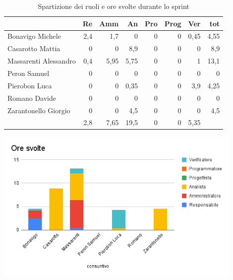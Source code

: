 \begin{table}[ht]
    \begin{tabularx}{\linewidth}{X|rrrrrrr}
    \rowcolor{gray!30}& Re & Amm & An & Pro & Prog & Ver & tot \\
    \hline
    Bonavigo Michele                        & 2,4 & 1,7 & 0 & 0 & 0 & 0,45  & 4,55 \\
    \rowcolor{gray!10}Casarotto Mattia      & 0 & 0 & 8,9 & 0 & 0 & 0 & 8,9 \\
    Massarenti Alessandro                   & 0,4 & 5,95 & 5,75 & 0 & 0 & 1  & 13,1 \\
    \rowcolor{gray!10}Peron Samuel          & 0 & 0 & 0 & 0 & 0 & 0 & 0 \\
    Pierobon Luca                           & 0 & 0 & 0,35 & 0 & 0 & 3,9 & 4,25 \\
    \rowcolor{gray!10}Romano Davide         & 0 & 0 & 0 & 0 & 0 & 0 & 0 \\
    Zarantonello Giorgio                    & 0 & 0 & 4,5 & 0 & 0 & 0 & 4,5 \\
    \hline                                  & 2,8 & 7,65 & 19,5 & 0 & 0 & 5,35 & 
    \end{tabularx}
    \caption{\label{ruoli-persone}Spartizione dei ruoli e ore svolte durante lo sprint}
\end{table}

\begin{center}
\includegraphics[width=12cm]{img/ore-svolte.png}
\end{center}

